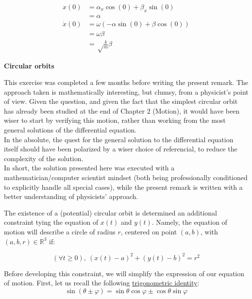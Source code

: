 \documentclass[solutions.tex]{subfiles}
\begin{document}
\begin{equation}
	\begin{aligned}
		x(0) &= \alpha_x\cos(0)+\beta_x\sin(0) \\
		~ &= \alpha \\
		\dot{x}(0) &= \omega(-\alpha\sin(0)+\beta\cos(0)) \\
		~ &= \omega\beta \\
		~ &= \sqrt\frac{k}{m}\beta
	\end{aligned}
\end{equation}

\hr
\textbf{Circular orbits}\ \\
\begin{remark} This exercise was completed a few months before
writing the present remark. The approach taken is mathematically
interesting, but clumsy, from a physicist's point of view.
Given the question, and given the fact that the simplest circular
orbit has already been studied at the end of Chapter $2$ (Motion),
it would have been wiser to start by verifying this motion, rather
than working from the most general solutions of the differential
equation. \\

In the absolute, the quest for the general solution to the
differential equation itself should have been polarized by a
wiser choice of referencial, to reduce the complexity of the
solution. \\

In short, the solution presented here was executed with a
mathematician/computer scientist mindset (both being professionally
conditioned to explicitly handle all special cases), while the present
remark is written with a better understanding of physicists' approach.
\end{remark}
The existence of a (potential) circular orbit
is determined an additional constraint tying the equation of $x(t)$ and
$y(t)$. Namely, the equation of motion will describe a circle of radius
$r$, centered on point $(a, b)$, with $(a, b, r)\in\mathbb{R}^3$ if:

\begin{equation}
	\label{eqn:L05E02:circle-constraint}
	(\forall t \geq 0),\ (x(t)-a)^2+(y(t)-b)^2 = r^2
\end{equation}

Before developing this constraint, we will simplify
the expression of our equation of motion. First, let us recall
the following
\href{https://en.wikipedia.org/wiki/List\_of\_trigonometric\_identities\#Angle\_sum\_and\_difference\_identities}
{trigonometric identity}:
\[
	\sin(\theta \pm \varphi) = \sin\theta\cos\varphi \pm \cos\theta\sin\varphi
\]
\end{document}
